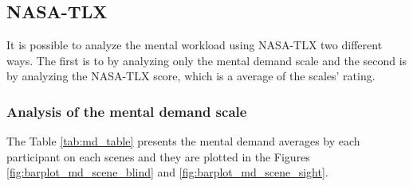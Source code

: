 \subsection{NASA-TLX}
\label{subsec:results_nasa_tlx}

It is possible to analyze the mental workload using NASA-TLX two different ways. The first is to by analyzing only the mental demand scale and the second is by analyzing the NASA-TLX score, which is a average of the scales' rating.

\subsubsection{Analysis of the mental demand scale}

The Table \ref{tab:md_table} presents the mental demand averages by each participant on each scenes and they are plotted in the Figures \ref{fig:barplot_md_scene_blind} and \ref{fig:barplot_md_scene_sight}.



